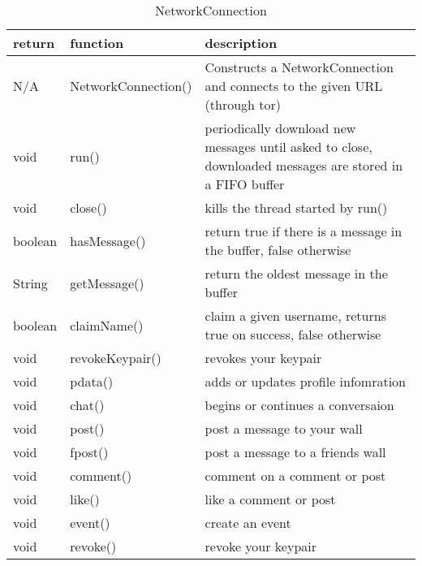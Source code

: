 \begin{table}[h]
    \centering
    \begin{tabular}{p{1cm}p{2.8cm}p{9cm}}
    return   & function            & description\\ \hline
    N/A      & NetworkConnection() & Constructs a NetworkConnection and connects to the given URL (through tor)\\
    void     & run()               & periodically download new messages until asked to close, downloaded messages are stored in a FIFO buffer\\
    void     & close()             & kills the thread started by run()\\
    boolean  & hasMessage()        & return true if there is a message in the buffer, false otherwise\\
    String   & getMessage()        & return the oldest message in the buffer\\
    
    boolean  & claimName()     & claim a given username, returns true on success, false otherwise\\
    void     & revokeKeypair() & revokes your keypair\\
    void     & pdata()         & adds or updates profile infomration\\
    void     & chat()          & begins or continues a conversaion\\
    void     & post()          & post a message to your wall\\
    void     & fpost()         & post a message to a friends wall\\
    void     & comment()       & comment on a comment or post\\
    void     & like()          & like a comment or post\\
    void     & event()         & create an event\\
    void     & revoke()        & revoke your keypair\\
    \end{tabular}
    \caption{NetworkConnection}
\end{table}

